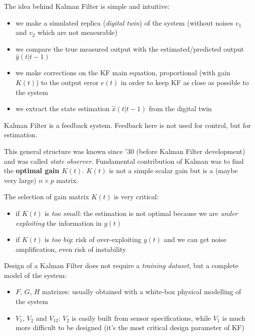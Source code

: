 The idea behind Kalman Filter is simple and intuitive:
\begin{itemize}
    \item we make a simulated replica (\emph{digital twin}) of the system (without noises $v_1$ and $v_2$ which are not measurable)
    \item we compare the true measured output with the estimated/predicted output $\hat{y}(t|t-1)$
    \item we make corrections on the KF main equation, proportional (with gain $K(t)$) to the output error $e(t)$ in order to keep KF as close as possible to the system 
    \item we extract the state estimation $\hat{x}(t|t-1)$ from the digital twin
\end{itemize}

\begin{obs}
    Kalman Filter is a feedback system.
    Feedback here is not used for control, but for estimation.
\end{obs}

This general structure was known since $'30$ (before Kalman Filter development) and was called \emph{state observer}.
Fundamental contribution of Kalman was to find the \textbf{optimal gain $K(t)$}.
$K(t)$ is not a simple scalar gain but is a (maybe very large) $n\times p$ matrix.

The selection of gain matrix $K(t)$ is very critical:
\begin{itemize}
    \item if $K(t)$ is \emph{too small}: the estimation is not optimal because we are \emph{under exploiting} the information in $y(t)$
    \item if $K(t)$ is \emph{too big}: risk of over-exploiting $y(t)$ and we can get noise amplification, even risk of instability
\end{itemize}

Design of a Kalman Filter does not require a \emph{training dataset}, but a complete model of the system:
\begin{itemize}
    \item $F$, $G$, $H$ matrixes: usually obtained with a white-box physical modelling of the system
    \item $V_1$, $V_2$ and $V_{12}$: $V_2$ is easily built from sensor specifications, while $V_1$ is much more difficult to be designed (it's the most critical design parameter of KF)
\end{itemize}

 